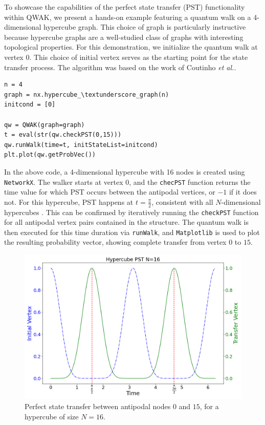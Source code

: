 \documentclass[main.tex]{subfiles}
\begin{document}
To showcase the capabilities of the perfect state transfer (PST) functionality
within QWAK, we present a hands-on example featuring a quantum walk on a
4-dimensional hypercube graph. This choice of graph is particularly instructive
because hypercube graphs are a well-studied class of graphs with interesting
topological properties. For this demonstration, we initialize the quantum walk
at vertex $0$. This choice of initial vertex serves as the starting point for
the state transfer process. The algorithm was based on the work of Coutinho \textit{et al.}\cite{coutinho17}.

\begin{lstlisting}[style=code,escapeinside={__}]
n = 4
graph = nx.hypercube_\textunderscore_graph(n)
initcond = [0]

qw = QWAK(graph=graph)
t = eval(str(qw.checkPST(0,15)))
qw.runWalk(time=t, initStateList=initcond)
plt.plot(qw.getProbVec())
\end{lstlisting}

In the above code, a 4-dimensional hypercube with 16 nodes is created using
\texttt{NetworkX}. The walker starts at vertex 0, and the \texttt{checPST}
function returns the time value for which PST occurs between the antipodal
vertices, or $-1$ if it does not. For this hypercube, PST happens at $t =
\frac{\pi}{2}$, consistent with all $N$-dimensional hypercubes
\cite{christandlPerfect04,Christandl2005}. This can be confirmed by iteratively
running the \texttt{checkPST} function for all antipodal vertex pairs contained
in the structure. The quantum walk is then executed for this time duration via
\texttt{runWalk}, and \texttt{Matplotlib} is used to plot the resulting
probability vector, showing complete transfer from vertex $0$ to $15$.\par

\begin{figure}[!h]
    \centering
    \includegraphics[scale=\mysinglefigurescale]{img/QWAK/PerfectStateTransfer/Hypercube_N16_T6.28_FROM0_TO15.png}
    \caption{Perfect state transfer between antipodal nodes $0$ and $15$, for a hypercube of size $N=16$.}
    \label{fig:hypercube_pst}
\end{figure}
\end{document}

